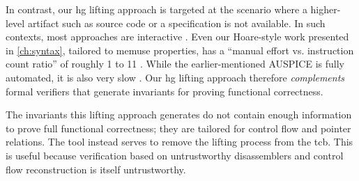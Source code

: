 In contrast, our \gls{hg} lifting approach is targeted at the scenario where a higher-level artifact such as source code or a specification is not available.
In such contexts, most approaches are interactive \autocite{goel2014syscalls,goelphd,verbeek2019refinement}.
Even our Hoare-style work presented in \cref{ch:syntax}, tailored to \gls{memuse} properties, has a ``manual effort vs. instruction count ratio'' of roughly 1 to 11 \autocite{verbeek2020automated}.
While the earlier-mentioned AUSPICE is fully automated, it is also very slow \textcite{tan2015auspice}.
Our \gls{hg} lifting approach therefore \emph{complements} formal verifiers that generate invariants for proving functional correctness.
\begin{remark}
  The invariants this lifting approach generates do not contain enough information to prove full functional correctness; they are tailored for control flow and pointer relations.
  The tool instead serves to remove the lifting process from the \gls{tcb}.
  This is useful because verification based on untrustworthy disassemblers and control flow reconstruction is itself untrustworthy.
\end{remark}

